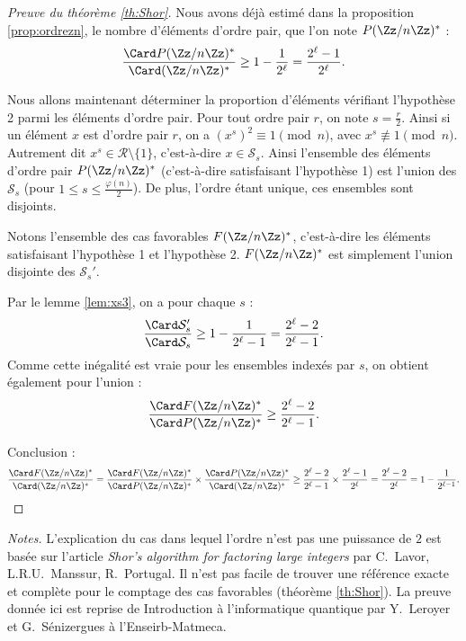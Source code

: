 \documentclass[11pt,class=report,crop=false]{standalone}
\begin{document}
\begin{proof}[Preuve du théorème \ref{th:Shor}]

Nous avons déjà estimé dans la proposition \ref{prop:ordrezn}, le nombre d'éléments d'ordre pair, que l'on note $P(\Zz/n\Zz)^*$ :
$$\frac{\Card P(\Zz/n\Zz)^*}{\Card (\Zz/n\Zz)^*} \ge 1-\frac{1}{2^\ell} = \frac{2^\ell-1}{2^\ell}.$$

Nous allons maintenant déterminer la proportion d'éléments vérifiant l'hypothèse 2 parmi les éléments d'ordre pair.
Pour tout ordre pair $r$, on note $s=\frac{r}{2}$. Ainsi si un élément $x$ est d'ordre pair $r$, on a $(x^s)^2 \equiv 1 \pmod n$, avec $x^s \not\equiv 1 \pmod n$. Autrement dit $x^s \in \mathcal{R} \setminus \{1\}$, c'est-à-dire $x \in \mathcal{S}_s$. Ainsi l'ensemble des éléments d'ordre pair $P(\Zz/n\Zz)^*$ (c'est-à-dire satisfaisant l'hypothèse 1) est l'union des $\mathcal{S}_s$ (pour $1 \le s \le \frac{\varphi(n)}{2}$). 
De plus, l'ordre étant unique, ces ensembles sont disjoints.

Notons l'ensemble des cas favorables $F(\Zz/n\Zz)^*$, c'est-à-dire les éléments satisfaisant l'hypothèse 1 et l'hypothèse 2.
$F(\Zz/n\Zz)^*$ est simplement l'union disjointe des $\mathcal{S}_s'$.

Par le lemme \ref{lem:xs3}, on a pour chaque $s$ :
$$\frac{\Card \mathcal{S}_s'}{\Card \mathcal{S}_s} 
\ge 1-\frac{1}{2^\ell-1}
= \frac{2^\ell-2}{2^\ell-1}.$$
Comme cette inégalité est vraie pour les ensembles indexés par $s$, on obtient également pour l'union :
$$\frac{\Card F(\Zz/n\Zz)^*}{\Card P(\Zz/n\Zz)^*} \ge \frac{2^\ell-2}{2^\ell-1}.$$


Conclusion :
$$\frac{\Card F(\Zz/n\Zz)^*}{\Card (\Zz/n\Zz)^*}
= 
\frac{\Card F(\Zz/n\Zz)^*}{\Card P(\Zz/n\Zz)^*}
\times 
\frac{\Card P(\Zz/n\Zz)^*}{\Card (\Zz/n\Zz)^*}
\ge \frac{2^\ell-2}{2^\ell-1} \times \frac{2^\ell-1}{2^\ell}
=  \frac{2^\ell-2}{2^\ell} = 1 - \frac1{2^{\ell-1}}.$$
\end{proof}


\bigskip
\bigskip

\emph{Notes.} 
L'explication du cas dans lequel l'ordre n'est pas une puissance de $2$ est basée sur l'article \emph{Shor’s algorithm for factoring large integers} par C.~Lavor, L.R.U.~Manssur, R.~Portugal.
Il n'est pas facile de trouver une référence exacte et complète pour le comptage des cas favorables (théorème \ref{th:Shor}). La preuve donnée ici est reprise de \og{}Introduction à l'informatique quantique\fg{} par Y.~Leroyer et G.~Sénizergues
à l'Enseirb-Matmeca.
\end{document}
